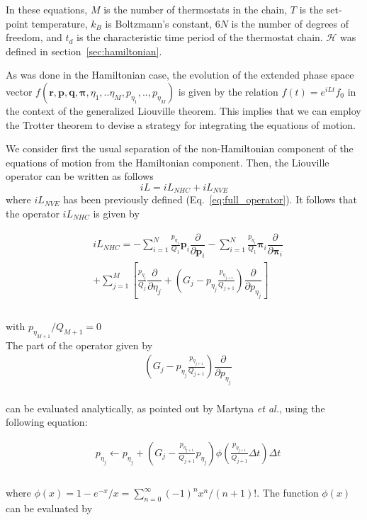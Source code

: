 \documentclass[aip,jcp,reprint,amsmath,amssymb]{revtex4-1}
\newcommand{\vt}[1]{\boldsymbol{\mathbf{#1}}}           %
\newcommand{\diff}[2]{\dfrac{\partial #1}{\partial #2}} %
\begin{document}
In these equations, $M$ is the number of thermostats in the chain, $T$ is the set-point temperature, $k_B$ is Boltzmann's constant, $6N$ is the number of degrees of freedom, and $t_d$ is the characteristic time period of the thermostat chain.  $\mathcal{H}$ was defined in section~\ref{sec:hamiltonian}.

As was done in the Hamiltonian case, the evolution of the extended phase space vector $ f(\vt r, \vt p, \vt q, \vt \pi, \eta_1,.. \eta_M, p_{\eta_1},..,p_{\eta_M}) $ is given by the relation $f(t) = e^{i L t}f_0$ in the context of the generalized Liouville theorem. This implies that we can employ the Trotter theorem to devise a strategy for integrating the equations of motion. 

We consider first the usual separation of the non-Hamiltonian component of the equations of motion from the Hamiltonian component. Then, the Liouville operator can be written as follows
\[
i L = i L_{NHC} + i L_{NVE}
\]
where $i L_{NVE}$ has been previously defined (Eq.~\ref{eq:full_operator}).
It follows that the operator $ i L_{NHC} $ is given by

\begin{equation}
\begin{split}
& i L_{NHC} = -\sum_{i=1}^{N} \frac{p_{\eta_1}}{Q_1} \vt p_i \diff{}{\vt p_i} - \sum_{i=1}^{N} \frac{p_{\eta_1}}{Q_1} \vt \pi_i \diff{}{\vt \pi_i} \\
& + \sum_{j=1}^{M}\left[\frac{p_{\eta_j}}{Q_j}\diff{}{\eta_j} + \left(G_j - p_{\eta_j} \frac{p_{\eta_{j+1}}} {Q_{j+1}}\right) \diff{}{p_{\eta_j}}\right]\\
\end{split}
\end{equation}
\\
with $p_{\eta_{M+1}}/Q_{M+1} = 0$
\\

The part of the operator given by 
\begin{align*}
&\left(G_j - p_{\eta_j} \frac{p_{\eta_{j+1}}}{Q_{j+1}}\right) \diff{}{p_{\eta_j}} \\
\end{align*}

can be evaluated analytically, as pointed out by Martyna \textit{et al.}\cite{Martyna1996}, using the following equation:

\begin{equation}
\label{eq:p_eta}
\begin{split}
&p_{\eta_j} \leftarrow p_{\eta_j} + \left( G_j - \frac{p_{\eta_{j+1}}}{Q_{j+1}} p_{\eta_j} \right) \phi\left( \frac{p_{\eta_{j+1}}}{Q_{j+1}} \Delta t \right) \Delta t \\
\end{split}
\end{equation}
\\
where $\phi(x) = 1-e^{-x}/x = \sum_{n=0}^\infty (-1)^n x^n/(n+1)!$. The function $\phi(x)$ can be evaluated by
\end{document}
